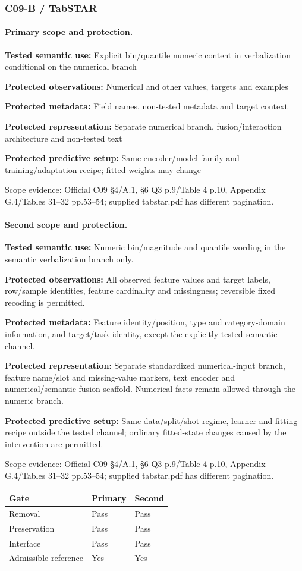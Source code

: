 \documentclass[10pt]{article}
\begin{document}
\subsubsection*{C09-B / TabSTAR}
\paragraph{Primary scope and protection.}
\textbf{Tested semantic use:} Explicit bin/quantile numeric content in verbalization conditional on the numerical branch\par
\textbf{Protected observations:} Numerical and other values, targets and examples\par
\textbf{Protected metadata:} Field names, non-tested metadata and target context\par
\textbf{Protected representation:} Separate numerical branch, fusion/interaction architecture and non-tested text\par
\textbf{Protected predictive setup:} Same encoder/model family and training/adaptation recipe; fitted weights may change\par
Scope evidence: Official C09 §4/A.1, §6 Q3 p.9/Table 4 p.10, Appendix G.4/Tables 31--32 pp.53--54; supplied tabstar.pdf has different pagination.\par
\paragraph{Second scope and protection.}
\textbf{Tested semantic use:} Numeric bin/magnitude and quantile wording in the semantic verbalization branch only.\par
\textbf{Protected observations:} All observed feature values and target labels, row/sample identities, feature cardinality and missingness; reversible fixed recoding is permitted.\par
\textbf{Protected metadata:} Feature identity/position, type and category-domain information, and target/task identity, except the explicitly tested semantic channel.\par
\textbf{Protected representation:} Separate standardized numerical-input branch, feature name/slot and missing-value markers, text encoder and numerical/semantic fusion scaffold. Numerical facts remain allowed through the numeric branch.\par
\textbf{Protected predictive setup:} Same data/split/shot regime, learner and fitting recipe outside the tested channel; ordinary fitted-state changes caused by the intervention are permitted.\par
Scope evidence: Official C09 §4/A.1, §6 Q3 p.9/Table 4 p.10, Appendix G.4/Tables 31--32 pp.53--54; supplied tabstar.pdf has different pagination.\par
\begin{tabular}{lll}\toprule Gate & Primary & Second \\ \midrule
Removal & Pass & Pass \\
Preservation & Pass & Pass \\
Interface & Pass & Pass \\
Admissible reference & Yes & Yes \\
\bottomrule\end{tabular}
\end{document}
